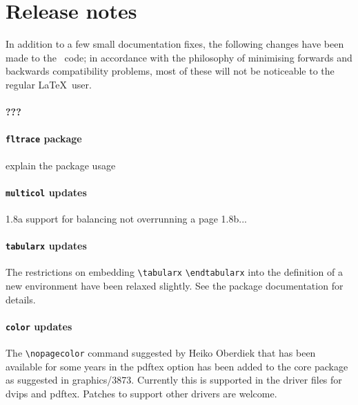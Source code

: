 \documentclass{ltnews}
\begin{document}
\section{Release notes}

In addition to a few small documentation fixes, the following changes have been made to the \LaTeXe\ code; in accordance with the philosophy of minimising forwards and backwards compatibility problems, most of these will not be noticeable to the regular \LaTeX\ user.

\paragraph{???}

\paragraph{\texttt{fltrace} package}

explain the package usage


\paragraph{\texttt{multicol} updates}

1.8a support for balancing not overrunning a page
1.8b...

\paragraph{\texttt{tabularx} updates}
The restrictions on embedding \verb|\tabularx| \verb|\endtabularx| into the definition of a new
environment have been relaxed slightly. See the package documentation for details.

\paragraph{\texttt{color} updates}
The \verb|\nopagecolor| command suggested by Heiko Oberdiek that has been available 
for some years in the \textsf{pdftex} option has been added to the core package as suggested in 
graphics/3873. Currently this is supported in the driver files for \textsf{dvips} and \textsf{pdftex}.
Patches to support other drivers are welcome.
\end{document}
